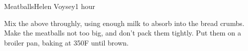 \begin{recipe}{Meatballs}{Helen Voysey}{1 hour}

  Mix the above throughly, using enough milk to absorb into the bread
  crumbs. Make the meatballs not too big, and don't pack them tightly. Put
  them on a broiler pan, baking at 350\0F until brown. 
\end{recipe}
